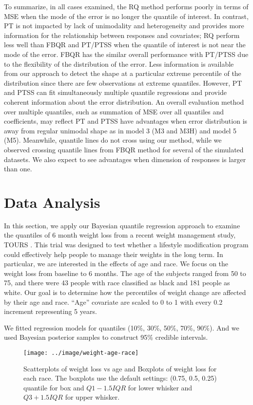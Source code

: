 \documentclass[12pt]{article}
\begin{document}
To summarize, in all cases examined, the RQ method performs poorly in terms of MSE when the mode of the error is no longer the quantile of interest.
In contrast, PT is not impacted by lack of unimodality and heterogeneity and provides more information for the relationship between responses and covariates;
RQ perform less well than FBQR and PT/PTSS when the quantile of interest is not near the mode of the error.
FBQR has the similar overall performance with PT/PTSS due to the flexibility of the distribution of the error.
Less information is available from our approach to detect the shape at a particular extreme percentile of the distribution since there are few observations at extreme quantiles.
However, PT and PTSS can fit simultaneously multiple quantile regressions and provide coherent information about the error distribution.
An overall evaluation method over multiple quantiles, such as summation of MSE over all quantiles and coefficients, may reflect PT and PTSS have advantages when error distribution is away from regular unimodal shape as in model 3 (M3 and M3H) and model 5 (M5).
Meanwhile, quantile lines do not cross using our method, while we observed crossing quantile lines from FBQR method for several of the simulated datasets.
We also expect to see advantages when dimension of responses is larger than one.

\section{Data Analysis}
\label{ch2:sec:tours}
In this section, we apply our Bayesian quantile regression approach to
examine the quantiles of 6 month weight loss from a recent weight
management study, TOURS \citep{perri2008extended}.  This trial was designed
to test whether a lifestyle modification program could effectively
help people to manage their weights in the long term.  In particular,
we are interested in the effects of age and race.  We focus on the
weight loss from baseline to 6 months. The age of the subjects ranged
from 50 to 75, and there were 43 people with race classified as black
and 181 people as white.  Our goal is to determine how the percentiles
of weight change are affected by their age and race.  ``Age''
covariate are scaled to 0 to 1 with every 0.2 increment representing 5
years.

We fitted regression models for quantiles (10\%, 30\%, 50\%, 70\%,
90\%). And we used Bayesian posterior samples to construct 95\%
credible intervals.

\begin{figure}[htbp]
  \centerline{\texttt{[image: ../image/weight-age-race]}}
  \caption[]{\label{ch2:fig:tours} Scatterplots of weight loss vs age and
    Boxplots of weight loss for each race.  The boxplots use the
    default settings: (0.75, 0.5, 0.25) quantile for box and
    $Q1-1.5IQR$ for lower whisker and $Q3+1.5IQR$ for upper whisker. }
\end{figure}
\end{document}
